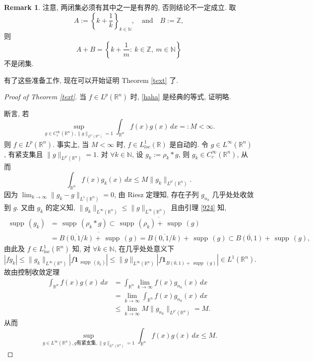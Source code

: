 \documentclass[a4paper,11pt]{article}
\theoremstyle{definition}
\newtheorem{remark}[theorem]{Remark}
\def \supp {\mathop\mathrm{\,supp\,}}
\begin{document}
\begin{remark}
注意, 两闭集必须有其中之一是有界的, 否则结论不一定成立.
取
$$
A := \left\{ k + \frac{1}{k} \right\}_{k \in \mathbb{N}},
\quad \text{and} \quad
B := \mathbb{Z},
$$
则
$$
A + B = \left\{ k + \frac{1}{m}:\ k \in \mathbb{Z},\ m \in \mathbb{N} \right\}
$$
不是闭集.
\end{remark}

有了这些准备工作, 现在可以开始证明 Theorem \ref{text} 了.

\begin{proof}[Proof of Theorem \ref{text}]
当 $ f \in L^p(\mathbb{R}^n) $ 时, \eqref{haha} 是经典的等式, 证明略.

断言, 若
$$
\sup_{g \in C_c^\infty(\mathbb{R}^n), \| g \|_{L^{p'}(\mathbb{R}^n)} = 1}
\int_{\mathbb{R}^n} f(x) g(x) \, dx =: M < \infty.
$$
则 $ f \in L^p(\mathbb{R}^n) $.
事实上, 当 $ M < \infty $ 时, $ f \in L_{loc}^1(\mathbb{R}) $ 是自动的.
令 $ g \in L^\infty(\mathbb{R}^n) $, 有紧支集且 $ \| g \|_{L^{p'}(\mathbb{R}^n)} = 1 $.
对 $ \forall k \in \mathbb{N} $, 设 $ g_k := \rho_k * g $, 则 $ g_k \in C_c^\infty(\mathbb{R}^n) $,
从而
$$
\int_{\mathbb{R}^n} f(x) g_k(x) \, dx \leq M \| g_k \|_{L^{p'}(\mathbb{R}^n)}.
$$
因为 $ \lim_{k \to \infty} \| g_k - g \|_{L^1(\mathbb{R}^n)} = 0 $, 由 Riesz 定理知,
存在子列 $ g_{n_k} $ 几乎处处收敛到 $ g $. 又由 $ g_k $ 的定义知,
$ \|g_k\|_{L^\infty(\mathbb{R}^n)} \leq \|g\|_{L^\infty(\mathbb{R}^n)} $
且由引理 \ref{924} 知,
\begin{align*}
\supp(g_k) &= \supp(\rho_k * g)
\subset \overline{\supp(\rho_k) + \supp(g)} \\
&= \overline{\overline{B(0, 1/k)} + \supp(g)}
= \overline{B(0, 1/k)} + \supp(g)
\subset \overline{B(0, 1)} + \supp(g),
\end{align*}
由此及 $ f \in L^1_{loc}(\mathbb{R}^n) $ 知,
对 $ \forall k \in \mathbb{N} $, 在几乎处处意义下
$$
|f g_k| \leq \|g_k\|_{L^\infty(\mathbb{R}^n)} |f \mathbf{1}_{\supp(g_k)}|
\leq \|g\|_{L^\infty(\mathbb{R}^n)} \left|f \mathbf{1}_{\overline{B(0, 1)} + \supp(g)}\right|
\in L^1(\mathbb{R}^n).
$$
故由控制收敛定理
\begin{align*}
\int_{\mathbb{R}^n} f(x) g(x) \, dx
&= \int_{\mathbb{R}^n} \lim_{k \to \infty} f(x) g_{n_k}(x) \, dx \\
&= \lim_{k \to \infty} \int_{\mathbb{R}^n} f(x) g_{n_k}(x) \, dx \\
&\leq \lim_{k \to \infty} M \| g_{n_k} \|_{L^{p'}(\mathbb{R}^n)}
= M.
\end{align*}
从而
$$
\sup_{g \in L^\infty(\mathbb{R}^n), g \text{有紧支集}, \| g \|_{L^{p'}(\mathbb{R}^n)} = 1}
\int_{\mathbb{R}^n} f(x) g(x) \, dx \leq M.
$$


\end{proof}
\end{document}
